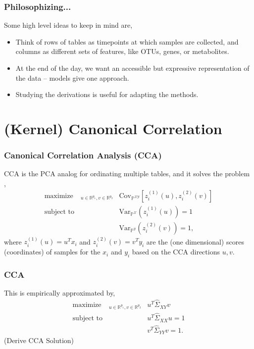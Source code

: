 \documentclass[10pt]{beamer}\usepackage[]{graphicx}\usepackage[]{color}
\def\reals{\mathbb{R}} %
\def\mrm#1{\mathrm{#1}}
\def\P{\mathbb{P}} %
\def\Cov{\mrm{Cov}} %
\def\Covsubarg#1#2{\Cov_{#1}\left[{#2}\right]}
\def\Var{\mrm{Var}}
\def\Varsubarg#1#2{\Var_{#1}\left(#2\right)}
\providecommand{\maximize}{\mathop\mathrm{maximize\quad}} %
\newcommand{\X}{\mathcal{X}}
\newcommand{\Y}{\mathcal{Y}}
\begin{document}
\begin{frame}
  \frametitle{Philosophizing...}
  Some high level ideas to keep in mind are,
  \begin{itemize}
  \item Think of rows of tables as timepoints at which samples are collected,
    and columns as different sets of features, like OTUs, genes, or metabolites.
  \item At the end of the day, we want an accessible but expressive
    representation of the data -- models give one approach.
  \item Studying the derivations is useful for adapting the methods.
  \end{itemize}
  \end{frame}

\section{(Kernel) Canonical Correlation}

\begin{frame}
\frametitle{Canonical Correlation Analysis (CCA)}
CCA is the PCA analog for ordinating multiple tables, and it solves the 
problem \cite{hotelling1936relations},
\begin{align}
  \maximize_{u \in \reals^{p_{1}}, v \in \reals^{p_{2}}}
  &\Covsubarg{\P^{\X\Y}}{z_{i}^{(1)}\left(u\right),
    z_{i}^{(2)}\left(v\right)} \label{eq:cancor_optim} \\
\text{subject to } &\Varsubarg{\P^{\X}}{z_{i}^{(1)}\left(u\right)} = 1 \\
&\Varsubarg{\P^{\Y}}{z_{i}^{(2)}\left(v\right)} = 1,
\end{align}
where $z_{i}^{(1)}\left(u\right) = u^{T}x_{i}$ and
$z_{i}^{(2)}\left(v\right) = v^{T}y_{i}$ are the (one dimensional) scores
(coordinates) of samples for the $x_{i}$ and $y_{i}$ based on the
CCA directions $u, v$.
\end{frame}

\begin{frame}
  \frametitle{CCA}
This is empirically approximated by,
\begin{align}
  \maximize_{u \in \reals^{p_{1}}, v \in \reals^{p_{2}}}
  &u^{T}\hat{\Sigma}_{XY}v \label{eq:cancor_optim_emp}\\
  \text{subject to } & u^{T}\hat{\Sigma}_{XX}u = 1 \\
  & v^{T}\hat{\Sigma}_{YY}v = 1.
\end{align}
(Derive CCA Solution)
\end{frame}
\end{document}

